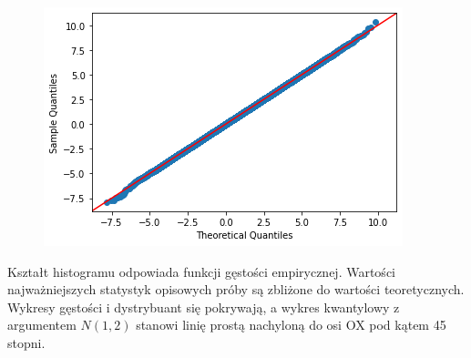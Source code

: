 \documentclass[12pt]{mwart}
\begin{document}
	\begin{figure} [H]
		\centering 
	\end{figure}
	
	\begin{figure} [H]
	\centering
	\includegraphics[scale=0.4877]{bm4.png}
	\end{figure}
	
	\noindent Kształt histogramu odpowiada funkcji gęstości empirycznej. Wartości najważniejszych statystyk opisowych próby są zbliżone do wartości teoretycznych.
 Wykresy gęstości i dystrybuant się pokrywają, a wykres kwantylowy z argumentem $N(1,2)$ stanowi linię prostą nachyloną do osi OX pod kątem 45 stopni.
	
\end{document}
